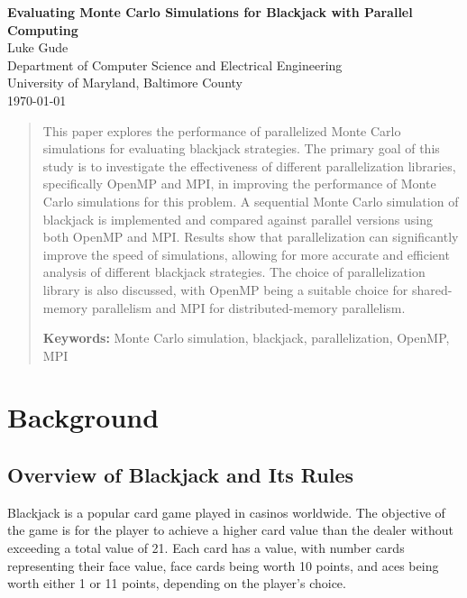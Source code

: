 \documentclass[12pt]{article}
\begin{document}
\begin{titlepage}
\begin{center}
    \Large \textbf{Evaluating Monte Carlo Simulations for Blackjack with Parallel Computing}\\[1.5cm]
    \large Luke Gude\\Department of Computer Science and Electrical Engineering\\University of Maryland, Baltimore County\\[1.5cm]
\vfill
{\large \today}
\end{center}
\end{titlepage}

\begin{abstract}
This paper explores the performance of parallelized Monte Carlo simulations for evaluating blackjack strategies. The primary goal of this study is to investigate the effectiveness of different parallelization libraries, specifically OpenMP and MPI, in improving the performance of Monte Carlo simulations for this problem. A sequential Monte Carlo simulation of blackjack is implemented and compared against parallel versions using both OpenMP and MPI. Results show that parallelization can significantly improve the speed of simulations, allowing for more accurate and efficient analysis of different blackjack strategies. The choice of parallelization library is also discussed, with OpenMP being a suitable choice for shared-memory parallelism and MPI for distributed-memory parallelism.

\textbf{Keywords:} Monte Carlo simulation, blackjack, parallelization, OpenMP, MPI
\end{abstract}

\section{Background}

\subsection{Overview of Blackjack and Its Rules}
Blackjack is a popular card game played in casinos worldwide. The objective of the game is for the player to achieve a higher card value than the dealer without exceeding a total value of 21. Each card has a value, with number cards representing their face value, face cards being worth 10 points, and aces being worth either 1 or 11 points, depending on the player's choice.
\end{document}
